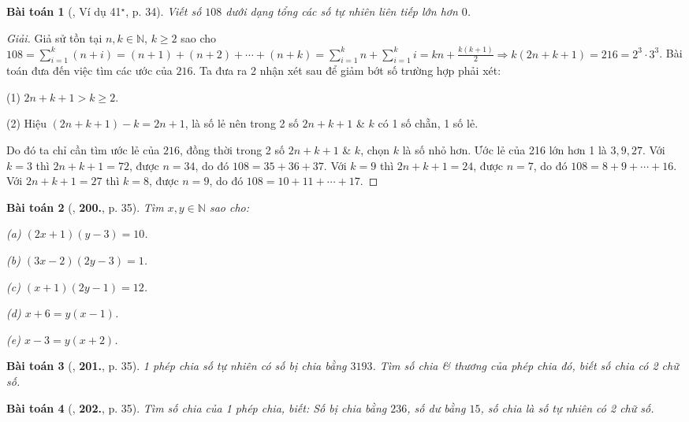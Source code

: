 \documentclass{article}
\numberwithin{equation}{section}
\newtheorem{baitoan}{Bài toán}[section]
\begin{document}
\begin{baitoan}[\cite{Binh_Toan_6_tap_1}, Ví dụ 41${}^\star$, p. 34]
	Viết số $108$ dưới dạng tổng các số tự nhiên liên tiếp lớn hơn $0$.
\end{baitoan}

\begin{proof}[Giải]
	Giả sử tồn tại $n,k\in\mathbb{N}$, $k\ge 2$ sao cho $108 = \sum_{i=1}^k (n + i) = (n + 1) + (n + 2) + \cdots + (n + k) = \sum_{i=1}^k n + \sum_{i=1}^k i = kn + \frac{k(k + 1)}{2}\Rightarrow k(2n + k + 1) = 216 = 2^3\cdot 3^3$. Bài toán đưa đến việc tìm các ước của $216$. Ta đưa ra 2 nhận xét sau để giảm bớt số trường hợp phải xét:
	\begin{enumerate*}
		\item[(1)] $2n + k + 1 > k\ge 2$.
		\item[(2)] Hiệu $(2n + k + 1) - k = 2n + 1$, là số lẻ nên trong 2 số $2n + k + 1$ \& $k$ có 1 số chẵn, 1 số lẻ.
	\end{enumerate*}
	Do đó ta chỉ cần tìm ước lẻ của $216$, đồng thời trong 2 số $2n + k + 1$ \& $k$, chọn $k$ là số nhỏ hơn. Ước lẻ của 216 lớn hơn 1 là $3,9,27$. Với $k = 3$ thì $2n + k + 1 = 72$, được $n = 34$, do đó $108 = 35 + 36 + 37$. Với $k = 9$ thì $2n + k + 1 = 24$, được $n = 7$, do đó $108 = 8 + 9 + \cdots + 16$. Với $2n + k + 1 = 27$ thì $k = 8$, được $n = 9$, do đó $108 = 10 + 11 + \cdots + 17$.
\end{proof}

\begin{baitoan}[\cite{Binh_Toan_6_tap_1}, \textbf{200.}, p. 35]
	Tìm $x,y\in\mathbb{N}$ sao cho:
	\begin{enumerate*}
		\item[(a)] $(2x + 1)(y - 3) = 10$.
		\item[(b)] $(3x - 2)(2y - 3) = 1$.
		\item[(c)] $(x + 1)(2y - 1) = 12$.
		\item[(d)] $x + 6 = y(x - 1)$.
		\item[(e)] $x - 3 = y(x + 2)$.
	\end{enumerate*}
\end{baitoan}

\begin{baitoan}[\cite{Binh_Toan_6_tap_1}, \textbf{201.}, p. 35]
	1 phép chia số tự nhiên có số bị chia bằng $3193$. Tìm số chia \& thương của phép chia đó, biết số chia có 2 chữ số.
\end{baitoan}

\begin{baitoan}[\cite{Binh_Toan_6_tap_1}, \textbf{202.}, p. 35]
	Tìm số chia của 1 phép chia, biết: Số bị chia bằng $236$, số dư bằng $15$, số chia là số tự nhiên có 2 chữ số.
\end{baitoan}	
\end{document}
